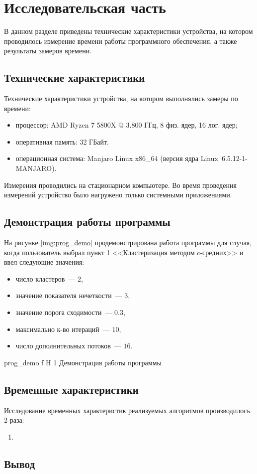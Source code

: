 \chapter{Исследовательская часть}

В данном разделе приведены технические характеристики устройства, на котором проводилось измерение времени работы программного обеспечения, а также результаты замеров времени.

\section{Технические характеристики}

Технические характеристики устройства, на котором выполнялись замеры по времени:

\begin{itemize}
	\item процессор: AMD Ryzen 7 5800X @ 3.800 ГГц, 8 физ. ядер, 16 лог. ядер;
	\item оперативная память: 32 ГБайт.
	\item операционная система: Manjaro Linux x86\_64 (версия ядра Linux~6.5.12-1-MANJARO).
\end{itemize}

Измерения проводились на стационарном компьютере.
Во время проведения измерений устройство было нагружено только системными приложениями.

\section{Демонстрация работы программы}

На рисунке \ref{img:prog_demo} продемонстрирована работа программы для случая, когда пользователь выбрал пункт 1 <<Кластеризация методом c-средних>> и ввел следующие значения:
\begin{itemize}
	\item число кластеров~--- $2$,
	\item значение показателя нечеткости~--- $3$,
	\item значение порога сходимости~--- $0.3$,
	\item максимально к-во итераций~--- $10$,
	\item число дополнительных потоков~--- $16$.
\end{itemize}

	{prog_demo}
	{f}
	{H}
	{1\textwidth}
	{Демонстрация работы программы}

\section{Временные характеристики}

Исследование временных характеристик реализуемых алгоритмов производилось 2 раза:
\begin{enumerate}
	\item 
\end{enumerate}

\section{Вывод}
